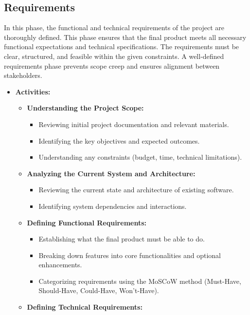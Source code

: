 \documentclass{article}
\begin{document}
\subsection{Requirements}
In this phase, the functional and technical requirements of the project are thoroughly defined. This phase ensures that the final product meets all necessary functional expectations and technical specifications. The requirements must be clear, structured, and feasible within the given constraints. A well-defined requirements phase prevents scope creep and ensures alignment between stakeholders.

\begin{itemize}[leftmargin=*, label={}]
    \item \textbf{Activities:}
    \begin{itemize}
        \item \textbf{Understanding the Project Scope:}
        \begin{itemize}
            \item Reviewing initial project documentation and relevant materials.
            \item Identifying the key objectives and expected outcomes.
            \item Understanding any constraints (budget, time, technical limitations).
        \end{itemize}
        \item \textbf{Analyzing the Current System and Architecture:}
        \begin{itemize}
            \item Reviewing the current state and architecture of existing software.
            \item Identifying system dependencies and interactions.
        \end{itemize}
        \item \textbf{Defining Functional Requirements:}
        \begin{itemize}
            \item Establishing what the final product must be able to do.
            \item Breaking down features into core functionalities and optional enhancements.
            \item Categorizing requirements using the MoSCoW method (Must-Have, Should-Have, Could-Have, Won't-Have).
        \end{itemize}
        \item \textbf{Defining Technical Requirements:}

\end{itemize}
\end{itemize}
\end{document}
